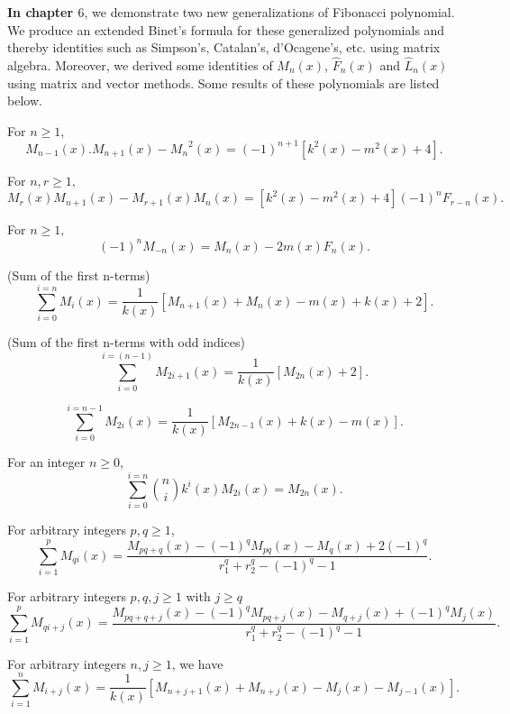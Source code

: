 \begin{large}
\noindent \textbf{In chapter $6$}, we demonstrate two new generalizations of Fibonacci polynomial. We produce an extended Binet's formula for these generalized polynomials and thereby identities such as Simpson's, Catalan's, d'Ocagene's, etc. using matrix algebra. Moreover, we derived some identities of $M_{n}(x)$, $\widehat{F}_{n}(x)$ and $\widehat{L}_{n}(x)$ using matrix and vector methods. 
Some results of these polynomials are listed below.
 \begin{theorem} For $n\geq{1}$, 
 $$M_{n-1}(x).M_{n+1}(x)-{{M}_{n}}^2(x)={(-1)}^{n+1}{[{k^{2}(x)-m^{2}(x)+4}]}.$$
\end{theorem}
\begin{theorem}
For $n,r\geq{1},$
$$M_{r}(x)M_{n+1}(x)-M_{r+1}(x)M_{n}(x)=[k^{2}(x)-m^{2}(x)+4](-1)^nF_{r-n}(x).$$
\end{theorem}
\begin{theorem}For $n\geq{1},$ $$
(-1)^{n}M_{-n}(x)=M_{n}(x)-2m(x)F_{n}(x).$$
\end{theorem}
\begin{theorem}(Sum of the first n-terms)
$$
\displaystyle\sum_{i=0}^{i=n}M_{i}(x)=\frac{1}{k(x)}[M_{n+1}(x)+M_{n}(x)-m(x)+k(x)+2].
$$
\end{theorem}
\begin{theorem}(Sum of the first n-terms with odd indices)
$$
\displaystyle\sum_{i=0}^{i=(n-1)}M_{2i+1}(x)=\frac{1}{k(x)}[M_{2n}(x)+2].$$
\end{theorem}
\begin{theorem}
$$
\displaystyle\sum_{i=0}^{i=n-1}M_{2i}(x)=\frac{1}{k(x)}[M_{2n-1}(x)+k(x)-m(x)].$$
\end{theorem}
\begin{theorem}
For an integer $n\geq0$, 
$$\displaystyle\sum_{i=0}^{i=n}\binom {n}{i}k^i(x)M_{2i}(x)=M_{2n}(x).$$
\end{theorem}
\begin{theorem}
For arbitrary integers $p,q\geq1$, 
$$
\displaystyle\sum_{i=1}^{p}M_{qi}(x)=\dfrac{M_{pq+q}(x)-(-1)^qM_{pq}(x)-M_{q}(x)+2(-1)^q}{r_{1}^q+r_{2}^q-(-1)^q-1}.$$
\end{theorem}
\begin{theorem}
For arbitrary integers $p,q,j\geq1$ with $j\geq{q}$
$$\displaystyle\sum_{i=1}^{p}M_{qi+j}(x)=\dfrac{M_{pq+q+j}(x)-(-1)^qM_{pq+j}(x)-M_{q+j}(x)+(-1)^qM_{j}(x)}{r_{1}^q+r_{2}^q-(-1)^q-1}.
$$
\end{theorem}
\begin{theorem}
For arbitrary integers $n,j\geq1$, we have
$$\displaystyle\sum_{i=1}^{n}M_{i+j}(x)=\dfrac{1}{k(x)}[{M_{n+j+1}(x)+M_{n+j}(x)-M_{j}(x)-M_{j-1}(x)}].$$

\end{theorem}
\end{large}
